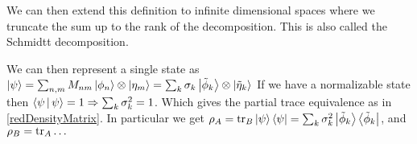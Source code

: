 We can then extend this definition to infinite dimensional spaces where we truncate
the sum up to the rank of the decomposition. This is also called the
{\color{red} Schmidtt decomposition}.

We can then represent a single state as
$\Ket{\psi} = \sum_{n,m} M_{nm} \Ket{\phi_n} \otimes \Ket{\eta_m} =
\sum_{k} \sigma_k \Ket{\tilde{\phi}_k} \otimes \Ket{\tilde{\eta}_k}$
If we have a normalizable state then $\Braket{\psi | \psi} = 1 \Rightarrow
\sum_k \sigma_k^2 = 1$. Which gives the partial trace equivalence as in 
\ref{redDensityMatrix}. In particular we get
$\rho_A = \operatorname{tr}_B \Ket{\psi}\Bra{\psi} = \sum_k \sigma_k^2 
\Ket{\tilde{\phi}_k}\Bra{\tilde{\phi}_k}$, and
$\rho_B = \operatorname{tr}_A \dots$
